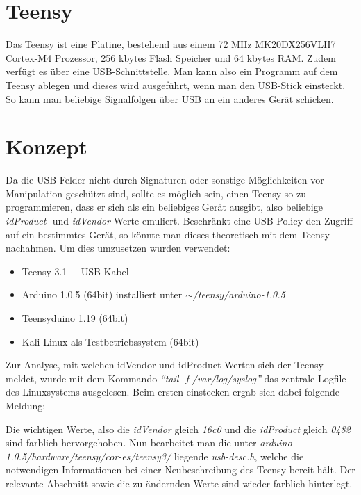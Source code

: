 \section{Teensy}
Das Teensy ist eine Platine, bestehend aus einem 72 MHz MK20DX256VLH7 Cortex-M4 Prozessor, 256 kbytes Flash Speicher und 64 kbytes RAM. Zudem verfügt es über eine USB-Schnittstelle. Man kann also ein Programm auf dem Teensy ablegen und dieses wird ausgeführt, wenn man den USB-Stick einsteckt. So kann man beliebige Signalfolgen über USB an ein anderes Gerät schicken.
			
\section{Konzept}
Da die USB-Felder nicht durch Signaturen oder sonstige Möglichkeiten vor Manipulation geschützt sind, sollte es möglich sein, einen Teensy so zu programmieren, dass er sich als ein beliebiges Gerät ausgibt, also beliebige \textit{idProduct}- und \textit{idVendor}-Werte emuliert. Beschränkt eine USB-Policy den Zugriff auf ein bestimmtes Gerät, so könnte man dieses theoretisch mit dem Teensy nachahmen.
Um dies umzusetzen wurden verwendet:

\begin{itemize}
	\item Teensy 3.1 + USB-Kabel
	\item Arduino 1.0.5 (64bit) installiert unter \textit{$\sim$/teensy/arduino-1.0.5}
	\item Teensyduino 1.19 (64bit)
	\item Kali-Linux als Testbetriebssystem (64bit)
\end{itemize}

Zur Analyse, mit welchen idVendor und idProduct-Werten sich der Teensy meldet, wurde mit dem Kommando \textit{"`tail -f /var/log/syslog"'} das zentrale Logfile des Linuxsystems ausgelesen. Beim ersten einstecken ergab sich dabei folgende Meldung:

\lstset{language=log}


Die wichtigen Werte, also die \textit{idVendor} gleich \textit{16c0} und die \textit{idProduct} gleich \textit{0482} sind farblich hervorgehoben. Nun bearbeitet man die unter \textit{arduino-1.0.5/hardware/teensy/cor-es/teensy3/} liegende \textit{usb-desc.h}, welche die notwendigen Informationen bei einer Neubeschreibung des Teensy bereit hält. Der relevante Abschnitt sowie die zu ändernden Werte sind wieder farblich hinterlegt.

